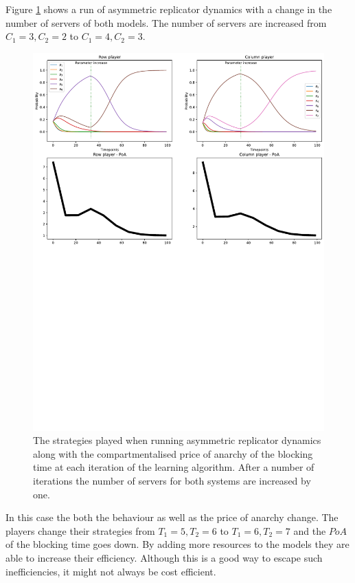Figure \ref{fig:ard_num_of_servers} shows a run of asymmetric replicator 
dynamics with a change in the number of servers of both models.
The number of servers are increased from \(C_1 = 3, C_2 = 2\) to 
\(C_1 = 4, C_2 = 3\).


\begin{figure}[H]
    \includegraphics[width=\textwidth, trim=0 400 0 0]{imgs/asymmetric_rd_and_PoA/asymmetric_increase_C.pdf}
    \caption{
        The strategies played when running asymmetric replicator dynamics
        along with the compartmentalised price of anarchy of the blocking time 
        at each iteration of the learning algorithm. After a number of 
        iterations the number of servers for both systems are increased by one.
    }
    \label{fig:ard_num_of_servers}
\end{figure}

In this case the both the behaviour as well as the price of anarchy change.
The players change their strategies from \(T_1 = 5, T_2 = 6\) to 
\(T_1 = 6, T_2 = 7\) and the \(PoA\) of the blocking time goes down.
By adding more resources to the models they are able to increase their 
efficiency.
Although this is a good way to escape such inefficiencies, it might not always
be cost efficient.

